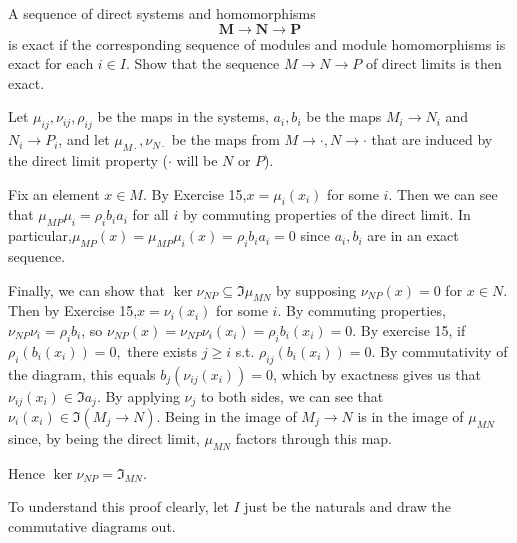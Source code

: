 \documentclass[a4paper]{exam}
\begin{document}
\begin{questions}
	\question A sequence of direct systems and homomorphisms
	\[
		\bm{M} \to \bm{N} \to \bm{P}
	\]
	is exact if the corresponding sequence of modules and module homomorphisms is exact for each $i\in I$. Show that the sequence $M\to N\to P$ of direct limits is then exact.
	\begin{solution}
		Let $\mu_{ij},\nu_{ij},\rho_{ij}$ be the maps in the systems, $a_i,b_i$ be the maps $M_i\to N_i$ and $N_i\to P_i $, and let $\mu_{M\cdot}, \nu_{N\cdot}$ be the maps from $M\to \cdot, N\to\cdot$ that are induced by the direct limit property ($\cdot$ will be $N$ or $P $).

		Fix an element $x \in M$.
		By Exercise 15,$x = \mu_i(x_i)$ for some $i$.
		Then we can see that $\mu_{MP} \mu_i = \rho _i b_ia_i$ for all $i$ by commuting properties of the direct limit.
		In particular,$\mu _{MP}(x) = \mu _{MP}\mu_i(x) = \rho_i b_ia_i = 0$ since $a_i,b_i$ are in an exact sequence.

		Finally, we can show that $\ker \nu_{NP} \subseteq \Im \mu_{MN}$ by supposing $\nu_{NP}(x) = 0$ for $x\in N$.
		Then by Exercise 15,$x = \nu_i(x_i)$ for some $i$.
		By commuting properties,$\nu_{NP}\nu_i = \rho_ib_i $, so $\nu_{NP}(x) = \nu_{NP}\nu_i(x_i) = \rho_ib_i(x_i) = 0$.
		By exercise 15, if $\rho_i(b_i(x_i)) = 0,$ there exists $j\ge i$ s.t. $\rho_{ij}(b_i(x_i)) = 0$.
		By commutativity of the diagram, this equals $b_j(\nu_{ij}(x_i)) = 0 $, which by exactness gives us that $\nu_{ij}(x_i) \in \Im a_j$.
		By applying $\nu_j$ to both sides, we can see that $\nu_i(x_i) \in \Im(M_j\to N)$.
		Being in the image of $M_j\to N$ is in the image of $\mu_{MN}$ since, by being the direct limit, $\mu_{MN}$ factors through this map.

		Hence $\ker \nu_{NP} = \Im_{MN}$.

		To understand this proof clearly, let $I$ just be the naturals and draw the commutative diagrams out.
	\end{solution}


\end{questions}
\end{document}
